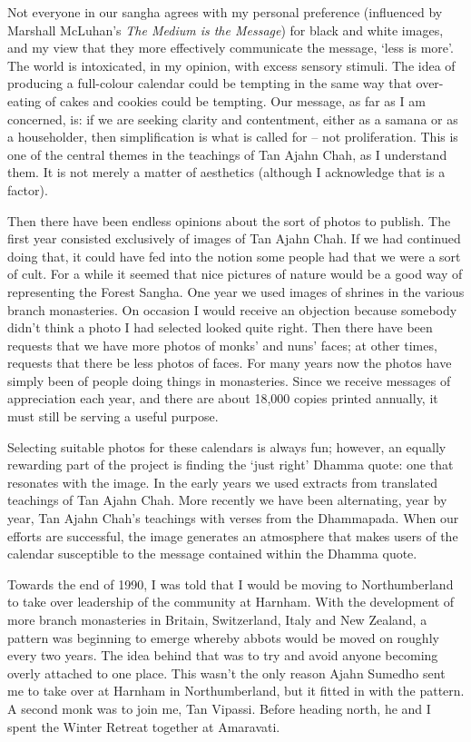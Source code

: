 Not everyone in our sangha agrees with my personal preference
(influenced by Marshall McLuhan's \emph{The Medium is the Message}) for
black and white images, and my view that they more effectively
communicate the message, `less is more'. The world is intoxicated, in my
opinion, with excess sensory stimuli. The idea of producing a
full-colour calendar could be tempting in the same way that over-eating
of cakes and cookies could be tempting. Our message, as far as I am
concerned, is: if we are seeking clarity and contentment, either as a
samana or as a householder, then simplification is what is called for --
not proliferation. This is one of the central themes in the teachings of Tan Ajahn Chah,
as I understand them. It is not merely a matter of aesthetics (although
I acknowledge that is a factor).

Then there have been endless opinions about the sort of photos to
publish. The first year consisted exclusively of images of Tan Ajahn
Chah. If we had continued doing that, it could have fed into the notion
some people had that we were a sort of cult. For a while it seemed that
nice pictures of nature would be a good way of representing the Forest
Sangha. One year we used images of shrines in the various branch
monasteries. On occasion I would receive an objection because somebody
didn't think a photo I had selected looked quite right. Then there have
been requests that we have more photos of monks' and nuns' faces; at
other times, requests that there be less photos of faces. For many years
now the photos have simply been of people doing things in monasteries.
Since we receive messages of appreciation each year, and there are about
18,000 copies printed annually, it must still be serving a useful
purpose.

Selecting suitable photos for these calendars is always fun; however, an
equally rewarding part of the project is finding the `just right' Dhamma
quote: one that resonates with the image. In the early years we used
extracts from translated teachings of Tan Ajahn Chah. More recently we
have been alternating, year by year, Tan Ajahn Chah's teachings with
verses from the Dhammapada. When our efforts are successful, the image
generates an atmosphere that makes users of the calendar susceptible to
the message contained within the Dhamma quote.

Towards the end of 1990, I was told that I would be moving to
Northumberland to take over leadership of the community at Harnham. With
the development of more branch monasteries in Britain, Switzerland,
Italy and New Zealand, a pattern was beginning to emerge whereby abbots
would be moved on roughly every two years. The idea behind that was to
try and avoid anyone becoming overly attached to one place. This wasn't
the only reason Ajahn Sumedho sent me to take over at Harnham in
Northumberland, but it fitted in with the pattern. A second monk was to
join me, Tan Vipassi. Before heading north, he and I spent the Winter
Retreat together at Amaravati.

